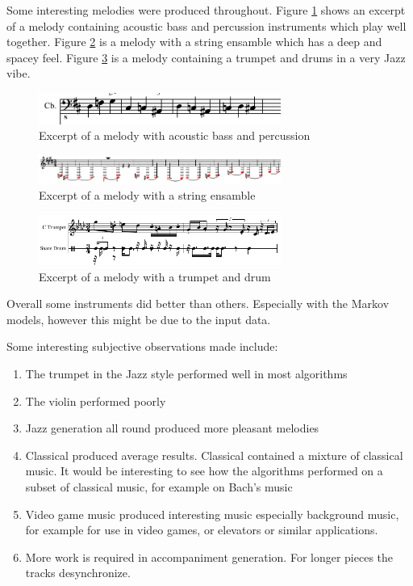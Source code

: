 Some interesting melodies were produced throughout. Figure \ref{ims:res_melody_bass_drum} shows an excerpt of a melody containing acoustic bass and percussion instruments which play well together. Figure \ref{ims:res_melody_string_spacey} is a melody with a string ensamble which has a deep and spacey feel. Figure \ref{ims:res_melody_trumpet_drum} is a melody containing a trumpet and drums in a very Jazz vibe.

\begin{figure}
\centerline{\includegraphics[width=300px]{../images/res_melody_bass_drum.pdf}}
\caption{Excerpt of a melody with acoustic bass and percussion}
\label{ims:res_melody_bass_drum}
\end{figure}

\begin{figure}
\centerline{\includegraphics[width=300px]{../images/res_melody_spacey_string.pdf}}
\caption{Excerpt of a melody with a string ensamble}
\label{ims:res_melody_string_spacey}
\end{figure}

\begin{figure}
\centerline{\includegraphics[width=300px]{../images/res_melody_trumpet_drum.pdf}}
\caption{Excerpt of a melody with a trumpet and drum}
\label{ims:res_melody_trumpet_drum}
\end{figure}

Overall some instruments did better than others. Especially with the Markov models, however this might be due to the input data. 

Some interesting subjective observations made include:
\begin{enumerate}
\item The trumpet in the Jazz style performed well in most algorithms
\item The violin performed poorly
\item Jazz generation all round produced more pleasant melodies
\item Classical produced average results. Classical contained a mixture of classical music. It would be interesting to see how the algorithms performed on a subset of classical music, for example on Bach's music
\item Video game music produced interesting music especially background music, for example for use in video games, or elevators or similar applications.
\item More work is required in accompaniment generation. For longer pieces the tracks desynchronize.
\end{enumerate}

